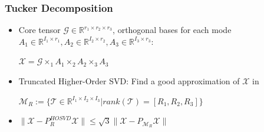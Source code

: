 \documentclass{beamer}
\begin{document}
\begin{frame}
\frametitle{Tucker Decomposition}
\begin{itemize}
\item Core tensor $\mathcal{G}\in \mathbb{R}^{r_1\times r_2\times r_3}$, orthogonal bases for each mode $A_1\in \mathbb{R}^{I_1\times r_1},A_2\in \mathbb{R}^{I_2\times r_2}, A_3\in \mathbb{R}^{I_3\times r_3}$:\\ \begin{center} $ \mathcal{X} =  \mathcal{G} \times_1 A_1\times_2 A_2 \times_3 A_3$\end{center}
\item Truncated Higher-Order SVD: Find a good approximation of $\mathcal{X}$ in \\  \begin{center}$\mathcal{M}_R:=\{ \mathcal{T} \in \mathbb{R}^{I_1\times I_2\times I_3} | rank(\mathcal{T})=[R_1, R_2, R_3] \}$ \end{center}
\item $ \| \mathcal{X}-P^{HOSVD}_R \mathcal{X}\|\leqslant \sqrt{3} \| \mathcal{X} - P_{\mathcal{M}_R}\mathcal{X}\|$


\end{itemize}
\end{frame}
\end{document}
